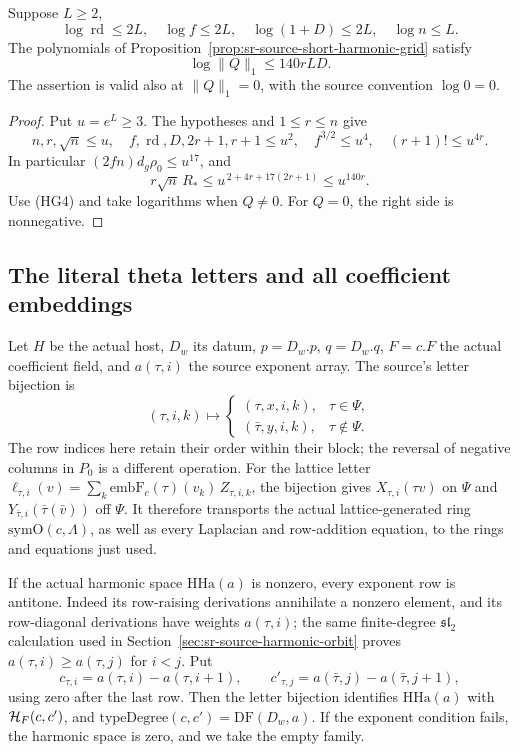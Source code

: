 \begin{srlemma}\label{lem:sr-source-short-harmonic-log}
Suppose \(L\ge2\),
\[
 \log\operatorname{rd}\le2L,\quad \log f\le2L,\quad
 \log(1+D)\le2L,\quad \log n\le L .
\]
The polynomials of Proposition~\ref{prop:sr-source-short-harmonic-grid}
satisfy
\[
       \log\|Q\|_1\le140rLD.
 \tag{HG8}\label{eq:sr-source-short-harmonic-log}
\]
The assertion is valid also at \(\|Q\|_1=0\), with the
source convention \(\log0=0\).
\end{srlemma}
\begin{proof}
Put \(u=e^L\ge3\).
The hypotheses and \(1\le r\le n\) give
\[
 n,r,\sqrt n\le u,\quad f,\operatorname{rd},D,
                       2r+1,r+1\le u^2,\quad
 f^{3/2}\le u^4,\quad (r+1)!\le u^{4r}.
\]
In particular
\((2fn)d_g\rho_0\le u^{17}\), and
\[
 r\sqrt n\,R_*
       \le u^{\,2+4r+17(2r+1)}\le u^{140r}.
\]
Use (HG4) and take logarithms when \(Q\ne0\).
For \(Q=0\), the right side is nonnegative.
\end{proof}

\subsection{The literal theta letters and all coefficient embeddings}
Let \(H\) be the actual host, \(D_w\) its datum,
\(p=D_w.p\), \(q=D_w.q\), \(F=c.F\) the actual coefficient
field, and \(a(\tau,i)\) the source exponent array.
The source's letter bijection is
\[
 (\tau,i,k)\longmapsto
 \begin{cases}
   (\tau,x,i,k),&\tau\in\Psi,\\
   (\bar\tau,y,i,k),&\tau\notin\Psi .
 \end{cases}
 \tag{HG9}\label{eq:sr-source-theta-letter-bijection}
\]
The row indices here retain their order within their
block; the reversal of negative columns in \(P_0\)
is a different operation.
For the lattice letter
\(\ell_{\tau,i}(v)=\sum_k\mathrm{embF}_c(\tau)(v_k)
\,Z_{\tau,i,k}\), the bijection gives
\(X_{\tau,i}(\tau v)\) on \(\Psi\) and
\(Y_{\bar\tau,i}(\bar\tau(\bar v))\) off \(\Psi\).
It therefore transports the actual lattice-generated
ring \(\mathrm{symO}(c,\Lambda)\), as well as every
Laplacian and row-addition equation, to the rings and
equations just used.

If the actual harmonic space \(\mathrm{HHa}(a)\)
is nonzero, every exponent row is antitone.
Indeed its row-raising derivations annihilate a
nonzero element, and its row-diagonal derivations
have weights \(a(\tau,i)\); the same finite-degree
\(\mathfrak{sl}_2\) calculation used in
Section~\ref{sec:sr-source-harmonic-orbit} proves
\(a(\tau,i)\ge a(\tau,j)\) for \(i<j\).
Put
\[
 c_{\tau,i}=a(\tau,i)-a(\tau,i+1),\qquad
 c'_{\tau,j}=a(\bar\tau,j)-a(\bar\tau,j+1),
\]
using zero after the last row.
Then the letter bijection identifies
\(\mathrm{HHa}(a)\) with
\({\cal H}_F(c,c')\), and
\(\mathrm{typeDegree}(c,c')=\mathrm{DF}(D_w,a)\).
If the exponent condition fails, the harmonic space
is zero, and we take the empty family.

